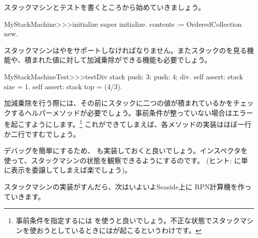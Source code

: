\documentclass[a4paper,10pt,twoside]{book}
\begin{document}
スタックマシンとテストを書くところから始めていきましょう。


\begin{code}{}
MyStackMachine>>>initialize
	super initialize.
	contents := OrderedCollection new.
\end{code}

スタックマシンはやをサポートしなければなりません。またスタックのを見る機能や、積まれた値に対して加減乗除ができる機能も必要でしょう。


\begin{code}{}
MyStackMachineTest>>>testDiv
	stack
		push: 3;
		push: 4;
		div.
	self assert: stack size = 1.
	self assert: stack top = (4/3).
\end{code}

加減乗除を行う際には、その前にスタックに二つの値が積まれているかをチェックするヘルパーメソッドが必要でしょう。事前条件が整っていない場合はエラーを起こすようにします。\footnote{事前条件を指定するには  を使うと良いでしょう。不正な状態でスタックマシンを使おうとしているときにはが起こるというわけです。}
これができてしまえば、各メソッドの実装はほぼ一行か二行ですむでしょう。

デバッグを簡単にするため、 も実装しておくと良いでしょう。インスペクタを使って、スタックマシンの状態を観察できるようにするのです。
(ヒント:  に単に表示を委譲してしまえば楽でしょう)。


スタックマシンの実装がすんだら、次はいよいよSeaside上に RPN計算機を作っていきます。
\end{document}
